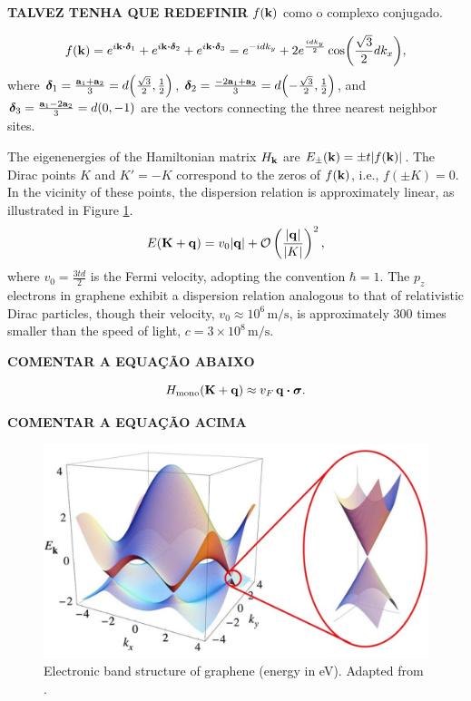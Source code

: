 \textbf{TALVEZ TENHA QUE REDEFINIR} $f({\vb{k}})$ como o complexo conjugado.

\begin{equation} \label{eq:monolayer-fk}
f(\k) = e^{i \k \vdot \bm{\delta}_1} + e^{i \k \vdot \bm{\delta}_2} + e^{i \k \vdot \bm{\delta}_3} =
e^{-idk_y} + 2 e^{\frac{idk_y}{2}} \cos(\frac{\sqrt{3}}{2} dk_x),
\end{equation}
where \(\bm{\delta}_1 = \frac{{\vb{a}}_1 + {\vb{a}}_2}{3} = d \qty(\frac{\sqrt{3}}{2}, \frac{1}{2})\), \(\bm{\delta}_2 = \frac{-2 {\vb{a}}_1 + {\vb{a}}_2}{3} = d \qty(-\frac{\sqrt{3}}{2}, \frac{1}{2})\), and \(\bm{\delta}_3 = \frac{{\vb{a}}_1 - 2 {\vb{a}}_2}{3} = d \qty(0, -1)\) are the vectors connecting the three nearest neighbor sites.

The eigenenergies of the Hamiltonian matrix \(H_{\vb{k}}\) are \(E_\pm({\vb{k}}) = \pm t \abs{f({\vb{k}})}\). The Dirac points \(K\) and \(K' = -K\) correspond to the zeros of \(f({\vb{k}})\), i.e., \(f(\pm K) = 0\). In the vicinity of these points, the dispersion relation is approximately linear, as illustrated in Figure \ref{fig:monolayer_dispersion}.
\begin{equation} \label{eq:linear_Ek_monolayer}
E({\vb{K}} + {\vb{q}}) = v_0 \abs{{\vb{q}}} + \mathcal{O}\left(\frac{\abs{{\vb{q}}}}{\abs{K}}\right)^2,
\end{equation}
where \( v_0 = \frac{3td}{2} \) is the Fermi velocity, adopting the convention \(\hbar = 1\). The \(p_z\) electrons in graphene exhibit a dispersion relation analogous to that of relativistic Dirac particles, though their velocity, \(v_0 \approx 10^6 \, \text{m/s}\), is approximately 300 times smaller than the speed of light, \(c = 3 \times 10^8 \, \text{m/s}\).

\textbf{COMENTAR A EQUAÇÃO ABAIXO}

$$
H_{\text{mono}}(\K + \q) \approx v_F \, \q \vdot \bm{\sigma}.
$$

\textbf{COMENTAR A EQUAÇÃO ACIMA}

\begin{figure}[H]
\centering
\includegraphics[width=0.8\linewidth]{fig/monolayer_dispersion.png}
\caption{Electronic band structure of graphene (energy in eV). Adapted from \cite{geim2009}.}
\label{fig:monolayer_dispersion}
\end{figure}

